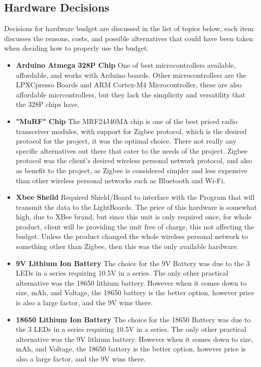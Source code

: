 \documentclass[12pt]{article}
\begin{document}
{{{		\subsection{Hardware Decisions}
		Decisions for hardware budget are discussed in the list of topics below, each item discusses the reasons, costs, and possible alternatives that could have been taken when deciding how to properly use the budget.

		{\renewcommand\labelitemi{}
			\begin{itemize}
				\item \textbf{Arduino Atmega 328P Chip}
				One of best microcontrollers available, affordable, and works with Arduino boards. Other microcontrollers are the LPXCpresso Boards and ARM Cortex-M4 Microcontroller, these are also affordable micrcontrollers, but they lack the simplicity and versatility that the 328P chips have. 
				\item \textbf{"MuRF" Chip}
				The MRF24J40MA chip is one of the best priced radio transceiver modules, with support for Zigbee protocol, which is the desired protocol for the project, it was the optimal choice. There not really any specific alternatives out there that cater to the needs of the project. Zigbee protocol was the client's desired wireless personal network protocol, and also as benefit to the project, as Zigbee is considered simpler and less expensive than other wireless personal networks such as Bluetooth and Wi-Fi.
				\item \textbf{Xbee Sheild}
				Required Shield/Board to interface with the Program that will transmit the data to the LightBoards. The price of this hardware is somewhat high, due to XBee brand, but since this unit is only required once, for whole product, client will be providing the unit free of charge, this not affecting the budget. Unless the product changed the whole wireless personal network to something other than Zigbee, then this was the only available hardware. 
				\item \textbf{9V Lithium Ion Battery}
				The choice for the 9V Battery was due to the 3 LEDs in a series requiring 10.5V in a series. The only other practical alternative was the 18650 lithium battery. However when it comes down to size, mAh, and Voltage, the 18650 battery is the better option, however price is also a large factor, and the 9V wins there.
				\item \textbf{18650 Lithium Ion Battery}
				The choice for the 18650 Battery was due to the 3 LEDs in a series requiring 10.5V in a series. The only other practical alternative was the 9V lithium battery. However when it comes down to size, mAh, and Voltage, the 18650 battery is the better option, however price is also a large factor, and the 9V wins there.

\end{itemize}}}}}
\end{document}

